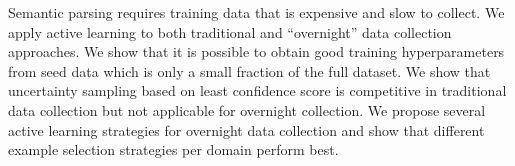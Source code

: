 Semantic parsing requires training data that is expensive and slow to collect. We apply active learning to both traditional and ``overnight'' data collection approaches. We show that it is possible to obtain good training hyperparameters from seed data which is only a small fraction of the full dataset. We show that uncertainty sampling based on least confidence score is competitive in traditional data collection but not applicable for overnight collection. We propose several active learning strategies for overnight data collection and show that different example selection strategies per domain perform best.
